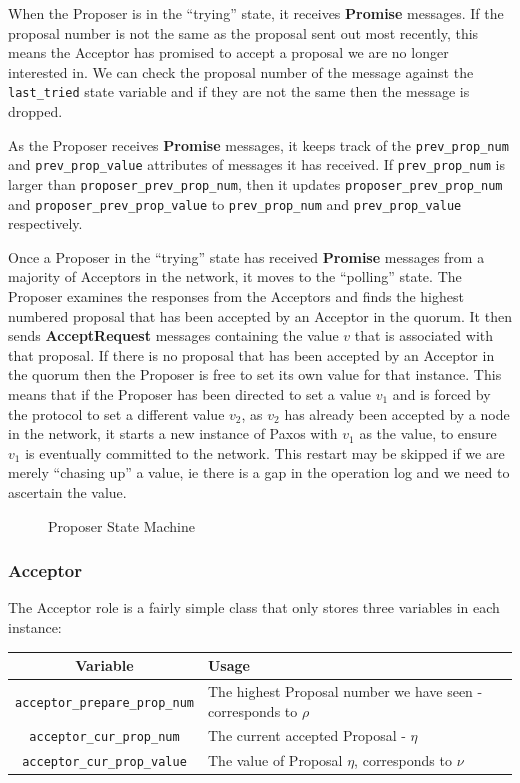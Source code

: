 \documentclass[12pt,twoside,notitlepage]{report}
\newcommand{\lwincludegraphics}[2][]{%
  \sbox{0}{\texttt{[image: \#2]}}%
  \ifdim\wd0>\linewidth
    \resizebox{\linewidth}{!}{\box0 }%
  \else
    \leavevmode\box0
  \fi}
\newcommand{\msg}[1] {{\bf #1}}         %
\begin{document}
When the Proposer is in the ``trying'' state, it receives \msg{Promise} messages. If the proposal
number is not the same as the proposal sent out most recently, this means the Acceptor has
promised to accept a proposal we are no longer interested in. We can check the proposal number of
the message against the \verb+last_tried+ state variable and if they are not the same then the
message is dropped.

As the Proposer receives \msg{Promise} messages, it keeps track of the \verb+prev_prop_num+ and
\verb+prev_prop_value+ attributes of messages it has received. If \verb+prev_prop_num+ is larger
than \verb+proposer_prev_prop_num+, then it updates \verb+proposer_prev_prop_num+
and \verb+proposer_prev_prop_value+ to \verb+prev_prop_num+ and \verb+prev_prop_value+
respectively.

Once a Proposer in the ``trying'' state has received \msg{Promise} messages from a majority of
Acceptors in the network, it moves to the ``polling'' state. The Proposer examines the responses
from the Acceptors and finds the highest numbered proposal that has been accepted by an Acceptor
in the quorum. It then sends \msg{AcceptRequest} messages containing the value $v$ that is
associated with that proposal. If there is no proposal that has been accepted by an Acceptor in
the quorum then the Proposer is free to set its own value for that instance. This means that if
the Proposer has been directed to set a value $v_1$ and is forced by the protocol to set a
different value $v_2$, as $v_2$ has already been accepted by a node in the network, it starts a
new instance of Paxos with $v_1$ as the value, to ensure $v_1$ is eventually committed to the
network. This restart may be skipped if we are merely ``chasing up'' a value, ie there is a gap in
the operation log and we need to ascertain the value.


\begin{figure}[htb]
\centering
\lwincludegraphics[scale=0.5]{figs/proposer-state-machine.eps}
\caption{\label{fig:proposer-state-machine}Proposer State Machine}
\end{figure}

\subsubsection{Acceptor}

The Acceptor role is a fairly simple class that only stores three variables in each instance:

\begin{tabular}{ | c | p{7cm} | }
  \hline
  {\bf Variable} & {\bf Usage} \\ \hline
  \verb+acceptor_prepare_prop_num+ & The highest Proposal number we have seen - corresponds to
  $\rho$ \\ \hline
  \verb+acceptor_cur_prop_num+ & The current accepted Proposal - $\eta$ \\ \hline
  \verb+acceptor_cur_prop_value+ & The value of Proposal $\eta$, corresponds to $\nu$ \\ \hline
\end{tabular}
\end{document}
